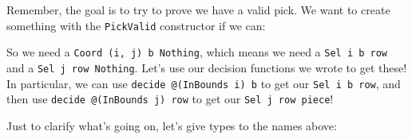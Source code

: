 \documentclass[]{article}
\newenvironment{Shaded}{}{}
\newcommand{\CommentTok}[1]{\textcolor[rgb]{0.38,0.63,0.69}{\textit{#1}}}
\newcommand{\DataTypeTok}[1]{\textcolor[rgb]{0.56,0.13,0.00}{#1}}
\newcommand{\FunctionTok}[1]{\textcolor[rgb]{0.02,0.16,0.49}{#1}}
\newcommand{\KeywordTok}[1]{\textcolor[rgb]{0.00,0.44,0.13}{\textbf{#1}}}
\newcommand{\NormalTok}[1]{#1}
\newcommand{\OtherTok}[1]{\textcolor[rgb]{0.00,0.44,0.13}{#1}}
\begin{document}
Remember, the goal is to try to prove we have a valid pick. We want to create
something with the \texttt{PickValid} constructor if we can:

\begin{Shaded}
\end{Shaded}

So we need a
\texttt{Coord\ \textquotesingle{}(i,\ j)\ b\ \textquotesingle{}Nothing}, which
means we need a \texttt{Sel\ i\ b\ row} and a
\texttt{Sel\ j\ row\ \textquotesingle{}Nothing}. Let's use our decision
functions we wrote to get these! In particular, we can use
\texttt{decide\ @(InBounds\ i)\ b} to get our \texttt{Sel\ i\ b\ row}, and then
use \texttt{decide\ @(InBounds\ j)\ row} to get our \texttt{Sel\ j\ row\ piece}!

\begin{Shaded}
\end{Shaded}

Just to clarify what's going on, let's give types to the names above:
\end{document}
